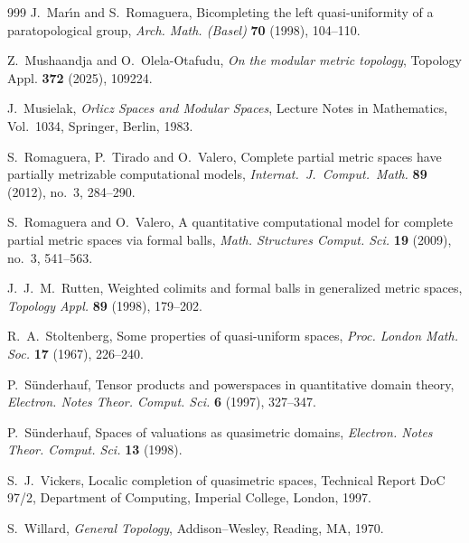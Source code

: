 \documentclass[preprint,12pt]{elsarticle}
\begin{document}
\begin{thebibliography}{999}
J.~Mar\'{\i}n and S.~Romaguera,
Bicompleting the left quasi-uniformity of a paratopological group,
\emph{Arch. Math. (Basel)} \textbf{70} (1998), 104--110.

Z.~Mushaandja and O.~Olela-Otafudu,
\emph{On the modular metric topology},
Topology Appl. \textbf{372} (2025), 109224.

J.~Musielak,
\emph{Orlicz Spaces and Modular Spaces},
Lecture Notes in Mathematics, Vol.~1034,
Springer, Berlin, 1983.

S.~Romaguera, P.~Tirado and O.~Valero,
Complete partial metric spaces have partially metrizable computational models,
\emph{Internat.\ J.\ Comput.\ Math.} \textbf{89} (2012), no.~3, 284--290.

S.~Romaguera and O.~Valero,
A quantitative computational model for complete partial metric spaces via formal balls,
\emph{Math. Structures Comput. Sci.} \textbf{19} (2009), no.~3, 541--563.

J.~J.~M.~Rutten,
Weighted colimits and formal balls in generalized metric spaces,
\emph{Topology Appl.} \textbf{89} (1998), 179--202.

R.~A.~Stoltenberg,
Some properties of quasi-uniform spaces,
\emph{Proc. London Math. Soc.} \textbf{17} (1967), 226--240.

P.~S{\"u}nderhauf,
Tensor products and powerspaces in quantitative domain theory,
\emph{Electron. Notes Theor. Comput. Sci.} \textbf{6} (1997), 327--347.

P.~S{\"u}nderhauf,
Spaces of valuations as quasimetric domains,
\emph{Electron. Notes Theor. Comput. Sci.} \textbf{13} (1998).

S.~J.~Vickers,
Localic completion of quasimetric spaces,
Technical Report DoC 97/2, Department of Computing,
Imperial College, London, 1997.

S.~Willard,
\emph{General Topology},
Addison--Wesley, Reading, MA, 1970.

\end{thebibliography}
\end{document}
